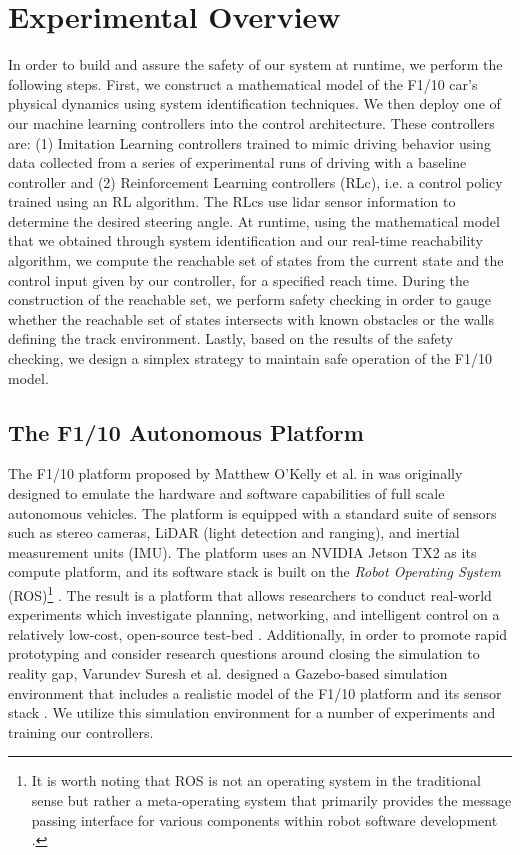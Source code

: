 \documentclass[manuscript,screen,review]{acmart}
\begin{document}
\section{Experimental Overview}

In order to build and assure the safety of our system at runtime, we perform the following steps. First, we construct a mathematical model of the F1/10 car's physical dynamics using system identification techniques. We then deploy one of our machine learning controllers into the control architecture. These controllers are: (1) Imitation Learning controllers trained to mimic driving behavior using data collected from a series of experimental runs of driving with a baseline controller and (2) Reinforcement Learning controllers (RLc), i.e. a control policy trained using an RL algorithm. The RLcs use lidar sensor information to determine the desired steering angle. At runtime, using the mathematical model that we obtained through system identification and our real-time reachability algorithm, we compute the reachable set of states from the current state and the control input given by our controller, for a specified reach time. During the construction of the reachable set, we perform safety checking in order to gauge whether the reachable set of states intersects with known obstacles or the walls defining the track environment. Lastly, based on the results of the safety checking, we design a simplex strategy to maintain safe operation of the F1/10 model. 

\subsection{The F1/10 Autonomous Platform}

The F1/10 platform proposed by Matthew O'Kelly et al. in \cite{F1102019} was originally designed to emulate the hardware and software capabilities of full scale autonomous vehicles. The platform is equipped with a standard suite of sensors such as stereo cameras, LiDAR (light detection and ranging), and inertial measurement units (IMU). The platform uses an NVIDIA Jetson TX2 as its compute platform, and its software stack is built on the \emph{Robot Operating System} (ROS)\footnote{It is worth noting that ROS is not an operating system in the traditional sense but rather a meta-operating system that primarily provides the message passing interface for various components within robot software development \cite{Huang2014}.} \cite{ROS}. The result is a platform that allows researchers to conduct real-world experiments which investigate planning, networking, and intelligent control on a relatively low-cost, open-source test-bed \cite{F1102019}. Additionally, in order to promote rapid prototyping and consider research questions around closing the simulation to reality gap\cite{Muratore2019}, Varundev Suresh et al. designed a Gazebo-based simulation environment \cite{Gazebo} that includes a realistic model of the F1/10 platform and its sensor stack \cite{varundev_ros_19}. We utilize this simulation environment for a number of experiments and training our controllers.
\end{document}
